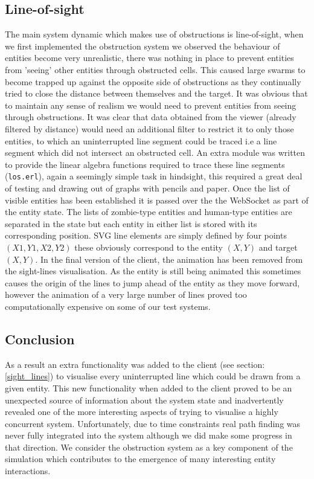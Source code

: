 \subsection{Line-of-sight}
\label{line_of_sight}
The main system dynamic which makes use of obstructions is line-of-sight, when we first implemented the obstruction system we observed the behaviour of entities become very unrealistic, there was nothing in place to prevent entities from 'seeing' other entities through obstructed cells. This caused large swarms to become trapped up against the opposite side of obstructions as they continually tried to close the distance between themselves and the target. It was obvious that to maintain any sense of realism we would need to prevent entities from seeing through obstructions.
It was clear that data obtained from the viewer (already filtered by distance) would need an additional filter to restrict it to only those entities, to which an uninterrupted line segment could be traced i.e a line segment which did not intersect an obstructed cell. An extra module was written to provide the linear algebra functions required to trace these line segments (\verb+los.erl+), again a seemingly simple task  in hindsight, this required a great deal of testing and drawing out of graphs with pencils and paper.
Once the list of visible entities has been established it is passed over the the WebSocket as part of the entity state. The lists of zombie-type entities and human-type entities are separated in the state but each entity in either list is stored with its corresponding position. SVG line elements are simply defined by four points \( (X1,Y1,X2,Y2) \) these obviously correspond to the entity \( (X,Y) \) and target \( (X,Y) \). In the final version of the client, the animation has been removed from the sight-lines visualisation. As the entity is still being animated this sometimes causes the origin of the lines to jump ahead of the entity as they move forward, however the animation of a very large number of lines proved too computationally expensive on some of our test systems.
\subsection{Conclusion}
As a result an extra functionality was added to the client (see section: \ref{sight_lines}) to visualise every uninterrupted line which could be drawn from a given entity. This new functionality when added to the client proved to be an unexpected source of information about the system state and inadvertently revealed one of the more interesting aspects of trying to visualise a highly concurrent system.
Unfortunately, due to time constraints real path finding was never fully integrated into the system although we did make some progress in that direction. We consider the obstruction system as a key component of the simulation which contributes to the emergence of many interesting entity interactions.

\clearpage
\endinput
